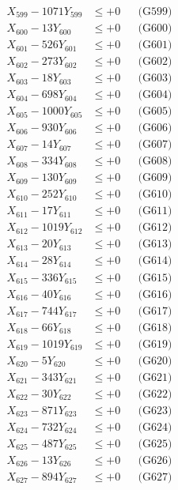 \documentclass[a4paper,10pt]{article}
\begin{document}
{\begin{align}
X_{599} - 1071Y_{599} &\leq +0 && \text{(G599)} \\
X_{600} - 13Y_{600} &\leq +0 && \text{(G600)} \\
\allowbreak
X_{601} - 526Y_{601} &\leq +0 && \text{(G601)} \\
X_{602} - 273Y_{602} &\leq +0 && \text{(G602)} \\
X_{603} - 18Y_{603} &\leq +0 && \text{(G603)} \\
X_{604} - 698Y_{604} &\leq +0 && \text{(G604)} \\
X_{605} - 1000Y_{605} &\leq +0 && \text{(G605)} \\
X_{606} - 930Y_{606} &\leq +0 && \text{(G606)} \\
X_{607} - 14Y_{607} &\leq +0 && \text{(G607)} \\
X_{608} - 334Y_{608} &\leq +0 && \text{(G608)} \\
X_{609} - 130Y_{609} &\leq +0 && \text{(G609)} \\
X_{610} - 252Y_{610} &\leq +0 && \text{(G610)} \\
\allowbreak
X_{611} - 17Y_{611} &\leq +0 && \text{(G611)} \\
X_{612} - 1019Y_{612} &\leq +0 && \text{(G612)} \\
X_{613} - 20Y_{613} &\leq +0 && \text{(G613)} \\
X_{614} - 28Y_{614} &\leq +0 && \text{(G614)} \\
X_{615} - 336Y_{615} &\leq +0 && \text{(G615)} \\
X_{616} - 40Y_{616} &\leq +0 && \text{(G616)} \\
X_{617} - 744Y_{617} &\leq +0 && \text{(G617)} \\
X_{618} - 66Y_{618} &\leq +0 && \text{(G618)} \\
X_{619} - 1019Y_{619} &\leq +0 && \text{(G619)} \\
X_{620} - 5Y_{620} &\leq +0 && \text{(G620)} \\
\allowbreak
X_{621} - 343Y_{621} &\leq +0 && \text{(G621)} \\
X_{622} - 30Y_{622} &\leq +0 && \text{(G622)} \\
X_{623} - 871Y_{623} &\leq +0 && \text{(G623)} \\
X_{624} - 732Y_{624} &\leq +0 && \text{(G624)} \\
X_{625} - 487Y_{625} &\leq +0 && \text{(G625)} \\
X_{626} - 13Y_{626} &\leq +0 && \text{(G626)} \\
X_{627} - 894Y_{627} &\leq +0 && \text{(G627)} \\

\end{align}}
\end{document}
